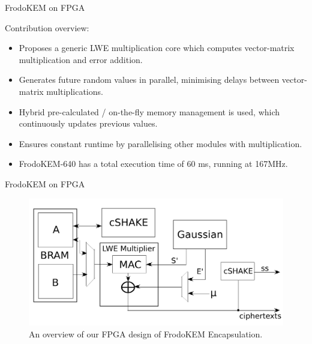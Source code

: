 \documentclass{beamer}            %
\begin{document}
\begin{frame}{FrodoKEM on FPGA}

Contribution overview:


\begin{itemize}
\item Proposes a generic LWE multiplication core which computes vector-matrix multiplication and error addition.
\item Generates future random values in parallel, minimising delays between vector-matrix multiplications.
\item Hybrid pre-calculated / on-the-fly memory management is used, which continuously updates previous values.
\item Ensures constant runtime by parallelising other modules with multiplication.
\item \textsf{FrodoKEM-640} has a total execution time of 60 ms, running at 167MHz.


\end{itemize}
\end{frame}


\begin{frame}{FrodoKEM on FPGA}

\begin{figure}
\includegraphics[scale=0.5]{FPGA_encaps}
\caption{An overview of our FPGA design of \textsf{FrodoKEM} Encapsulation.}
\end{figure}

\end{frame}
\end{document}
